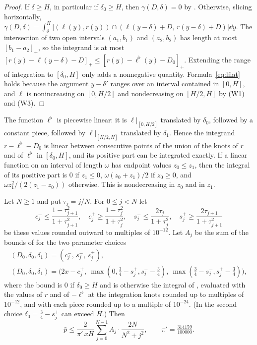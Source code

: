 \documentclass[11pt,colorlinks]{charlie}
\newcommand{\pos}[1]{\left[#1\right]_+}
\begin{document}
\begin{proof}
If $\delta\ge H$, in particular if $\delta_0\ge H$, then $\gamma(D,\delta)=0$ by . Otherwise, slicing horizontally, $\gamma(D,\delta)=\int_\delta^H\big|(\ell(y),r(y))\cap(\ell(y-\delta)+D,\,r(y-\delta)+D)\big|\dd y$. The intersection of two open intervals $(a_1,b_1)$ and $(a_2,b_2)$ has length at most $\pos{b_1-a_2}$, so the integrand is at most $\pos{r(y)-\ell(y-\delta)-D}\le\pos{r(y)-\ell^\flat(y)-D_0}$. Extending the range of integration to $[\delta_0,H]$ only adds a nonnegative quantity. Formula~\eqref{eq:lflat} holds because the argument $y-\delta'$ ranges over an interval contained in $[0,H]$, and $\ell$ is nonincreasing on $[0,H/2]$ and nondecreasing on $[H/2,H]$ by (W1) and (W3).
\end{proof}

The function $\ell^\flat$ is piecewise linear: it is $\ell|_{[0,H/2]}$ translated by $\delta_0$, followed by a constant piece, followed by $\ell|_{[H/2,H]}$ translated by $\delta_1$. Hence the integrand $r-\ell^\flat-D_0$ is linear between consecutive points of the union of the knots of $r$ and of $\ell^\flat$ in $[\delta_0,H]$, and its positive part can be integrated exactly. If a linear function on an interval of length $\omega$ has endpoint values $z_0\le z_1$, then the integral of its positive part is $0$ if $z_1\le0$, $\omega(z_0+z_1)/2$ if $z_0\ge0$, and $\omega z_1^2/(2(z_1-z_0))$ otherwise. This is nondecreasing in $z_0$ and in $z_1$.

\begin{proposition}\label{prop:pbar}
Let $N\ge1$ and put $\tau_j=j/N$. For $0\le j<N$ let
\[
 c^-_j\le\frac{1-\tau_{j+1}^2}{1+\tau_{j+1}^2},\quad c^+_j\ge\frac{1-\tau_j^2}{1+\tau_j^2},\quad s^-_j\le\frac{2\tau_j}{1+\tau_j^2},\quad s^+_j\ge\frac{2\tau_{j+1}}{1+\tau_{j+1}^2}
\]
be these values rounded outward to multiples of $10^{-12}$. Let $A_j$ be the sum of the bounds of  for the two parameter choices
\begin{gather*}
 (D_0,\delta_0,\delta_1)=(c^-_j,\,s^-_j,\,s^+_j),\\
 (D_0,\delta_0,\delta_1)=\big(2x-c^+_j,\ \max(0,\tfrac34-s^+_j,s^-_j-\tfrac34),\ \max(\tfrac34-s^-_j,s^+_j-\tfrac34)\big),
\end{gather*}
where the bound is $0$ if $\delta_0\ge H$ and is otherwise the integral of , evaluated with the values of $r$ and of $-\ell^\flat$ at the integration knots rounded up to multiples of $10^{-12}$, and with each piece rounded up to a multiple of $10^{-24}$. (In the second choice $\delta_0=\tfrac34-s^+_j$ can exceed $H$.) Then
\[
 \bar p\le\frac{2}{\pi'\,xH}\sum_{j=0}^{N-1}A_j\cdot\frac{2N}{N^2+j^2},\qquad \pi'=\tfrac{314159}{100000}.
\]
\end{proposition}
\end{document}
